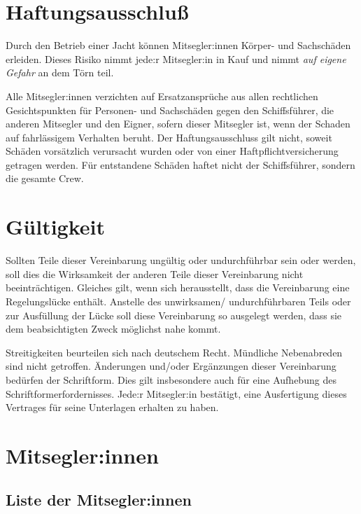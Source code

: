 \documentclass[a4paper,12pt]{article}
\begin{document}
\section{Haftungsausschluß}
\label{sec:Haftung}

Durch den Betrieb einer Jacht können Mitsegler:innen Körper- und Sachschäden erleiden.
Dieses Risiko nimmt jede:r Mitsegler:in in Kauf und nimmt \textit{auf eigene Gefahr} an dem Törn teil.

Alle Mitsegler:innen verzichten auf Ersatzansprüche aus allen rechtlichen Gesichtspunkten für Personen- und Sachschäden gegen den Schiffsführer, die anderen Mitsegler und den Eigner, sofern dieser Mitsegler ist, wenn der Schaden auf fahrlässigem Verhalten beruht.
Der Haftungsausschluss gilt nicht, soweit Schäden vorsätzlich verursacht wurden oder von einer Haftpflichtversicherung getragen werden.
Für entstandene Schäden haftet nicht der Schiffsführer, sondern die gesamte Crew.


\section{Gültigkeit}
\label{sec:Gueltigkeit}

Sollten Teile dieser Vereinbarung ungültig oder undurchführbar sein oder werden, soll dies die Wirksamkeit der anderen Teile dieser Vereinbarung nicht beeinträchtigen.
Gleiches gilt, wenn sich herausstellt, dass die Vereinbarung eine Regelungslücke enthält.
Anstelle des unwirksamen/ undurchführbaren Teils oder zur Ausfüllung der Lücke soll diese Vereinbarung so ausgelegt werden, dass sie dem beabsichtigten Zweck möglichst nahe kommt.

Streitigkeiten beurteilen sich nach deutschem Recht.
Mündliche Nebenabreden sind nicht getroffen.
Änderungen und/oder Ergänzungen dieser Vereinbarung bedürfen der Schriftform.
Dies gilt insbesondere auch für eine Aufhebung des Schriftformerfordernisses.
Jede:r Mitsegler:in bestätigt, eine Ausfertigung dieses Vertrages für seine Unterlagen erhalten zu haben.


\section{Mitsegler:innen}
\label{sec:Mitsegler}

\subsection*{Liste der Mitsegler:innen}
\end{document}
